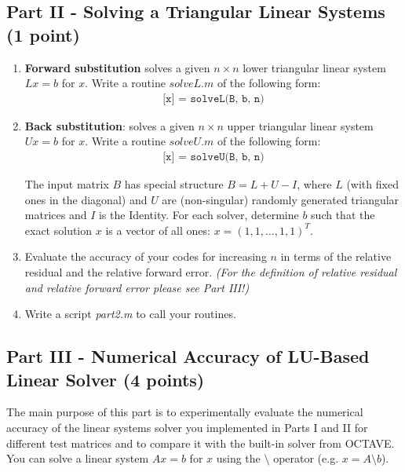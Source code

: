 \documentclass{scrartcl}
\begin{document}
    \subsection*{Part II - Solving a Triangular Linear Systems (1 point)}
        \begin{enumerate}
            \item \textbf{Forward substitution} solves a given $n \times n$ lower triangular linear system $Lx = b$ for $x$. Write a routine $solveL.m$ of the following form: 
            \begin{align*}
            \texttt{[x] = solveL(B, b, n)}
			\end{align*}
            \item \textbf{Back substitution}: solves a given $n \times n$ upper triangular linear system $Ux = b$ for $x$. Write a routine $solveU.m$ of the following form: 
            \begin{align*}
\texttt{[x] = solveU(B, b, n)}
			\end{align*}			
			
            

The input matrix $B$ has special structure $B = L + U - I$, where $L$ (with fixed ones in the diagonal) and $U$ are (non-singular) randomly generated triangular matrices and $I$ is the Identity. For each solver, determine $b$ such that the exact solution $x$ is a vector of all ones: $x = (1, 1, \dots, 1, 1)^{T}$.
			\item Evaluate the accuracy of your codes for increasing $n$ in terms of the relative residual and the relative forward error. \emph{(For the definition of relative residual and relative forward error please see Part III!)}

           	\item Write a script \textit{part2.m} to call your routines.
        \end{enumerate}

    \subsection*{Part III - Numerical Accuracy of LU-Based Linear Solver (4 points)}
    The main purpose of this part is to experimentally evaluate the numerical accuracy of the linear systems solver you implemented in Parts I and II for different test matrices and to compare it with the built-in solver from OCTAVE. 
    You can solve a linear system $Ax=b$ for $x$ using the $\setminus$ operator (e.g. $x = A \setminus b$).
 
\end{document}
